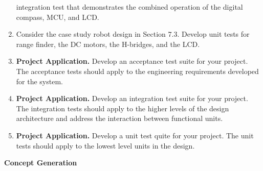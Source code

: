 \begin{enumerate}
  integration test that demonstrates the combined operation of the
  digital compass, MCU, and LCD.
\item
  Consider the case study robot design in Section 7.3. Develop unit
  tests for range finder, the DC motors, the H-bridges, and the LCD.
\item
  \textbf{Project Application.} Develop an acceptance test suite for
  your project. The acceptance tests should apply to the engineering
  requirements developed for the system.
\item
  \textbf{Project Application.} Develop an integration test suite for
  your project. The integration tests should apply to the higher levels
  of the design architecture and address the interaction between
  functional units.
\item
  \textbf{Project Application.} Develop a unit test quite for your
  project. The unit tests should apply to the lowest level units in the
  design.
\end{enumerate}

\textbf{Concept Generation}
